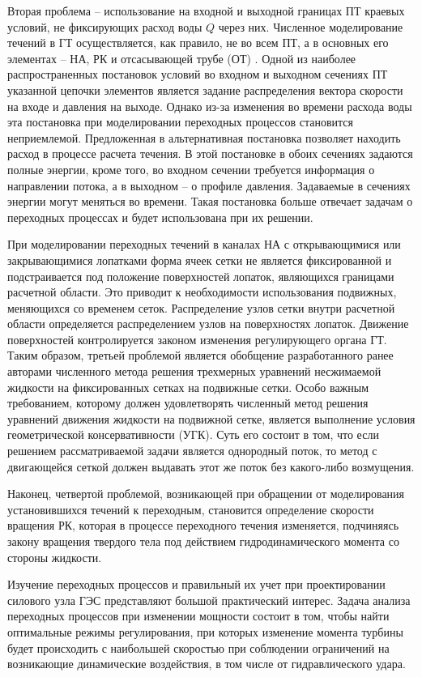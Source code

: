 Вторая проблема -- использование на входной и выходной границах ПТ краевых условий, не фиксирующих расход воды 
$Q$ через них. Численное моделирование течений в ГТ осуществляется, как правило, не во всем ПТ, а в основных 
его элементах -- НА, РК и отсасывающей трубе (ОТ) \cite{Cher}. Одной из наиболее распространенных постановок 
условий во входном и выходном сечениях ПТ указанной цепочки элементов является задание распределения вектора 
скорости на входе и давления на выходе. Однако из-за изменения во времени расхода воды эта постановка при 
моделировании переходных процессов становится неприемлемой. Предложенная в \cite{bannikov} альтернативная 
постановка позволяет находить расход в процессе расчета течения. В этой постановке в обоих сечениях задаются 
полные энергии, кроме того, во входном сечении требуется информация о направлении потока, а в
выходном -- о профиле давления. Задаваемые в сечениях энергии могут меняться во времени. Такая постановка 
больше отвечает задачам о переходных процессах и будет использована при их решении.

При моделировании переходных течений в каналах НА с открывающимися или закрывающимися лопатками форма ячеек 
сетки не является фиксированной и подстраивается под положение поверхностей лопаток, являющихся границами 
расчетной области. Это приводит к необходимости использования подвижных, меняющихся со временем сеток. 
Распределение узлов сетки внутри расчетной области определяется распределением узлов на поверхностях лопаток. 
Движение поверхностей контролируется законом изменения регулирующего органа ГТ. Таким образом, третьей 
проблемой является обобщение разработанного ранее авторами численного метода решения трехмерных уравнений 
несжимаемой жидкости на фиксированных сетках на подвижные сетки. Особо важным требованием, которому
должен удовлетворять численный метод решения уравнений движения жидкости на подвижной сетке, является 
выполнение условия геометрической консервативности (УГК). Суть его состоит в том, что если решением 
рассматриваемой задачи является однородный поток, то метод с двигающейся сеткой должен выдавать этот же поток 
без какого-либо возмущения.

Наконец, четвертой проблемой, возникающей при обращении от моделирования установившихся течений к 
переходным, становится определение скорости вращения РК, которая в процессе переходного течения изменяется, 
подчиняясь закону вращения твердого тела под действием гидродинамического момента со стороны жидкости.

Изучение переходных процессов и правильный их учет при проектировании силового узла ГЭС представляют большой 
практический интерес. Задача анализа переходных процессов при изменении мощности состоит в том, чтобы найти 
оптимальные режимы регулирования, при которых изменение момента турбины будет происходить с наибольшей 
скоростью при соблюдении ограничений на возникающие динамические воздействия, в том числе от гидравлического 
удара.

